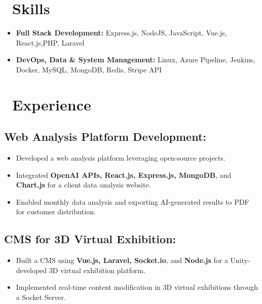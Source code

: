 \documentclass{resume}
\begin{document}



\section{\faCogs\ Skills}
\begin{itemize}[parsep=0.5ex]
  \item \textbf{Full Stack Development:} Express.js, NodeJS, JavaScript, Vue.js, React.js,PHP, Laravel
  \item \textbf{DevOps, Data \& System Management:} Linux, Azure Pipeline, Jenkins, Docker, MySQL, MongoDB, Redis, Stripe API
\end{itemize}

\section{\faUsers\ Experience}
\subsection*{Web Analysis Platform Development:}
\begin{itemize}[noitemsep]
    \item Developed a web analysis platform leveraging open-source projects.
    \item Integrated \textbf{OpenAI APIs, React.js, Express.js, MongoDB}, and \textbf{Chart.js} for a client data analysis website.
    \item Enabled monthly data analysis and exporting AI-generated results to PDF for customer distribution.
\end{itemize}

\subsection*{CMS for 3D Virtual Exhibition:}
\begin{itemize}[noitemsep]
    \item Built a CMS using \textbf{Vue.js, Laravel, Socket.io}, and \textbf{Node.js} for a Unity-developed 3D virtual exhibition platform.
    \item Implemented real-time content modification in 3D virtual exhibitions through a Socket Server.
\end{itemize}
\end{document}

